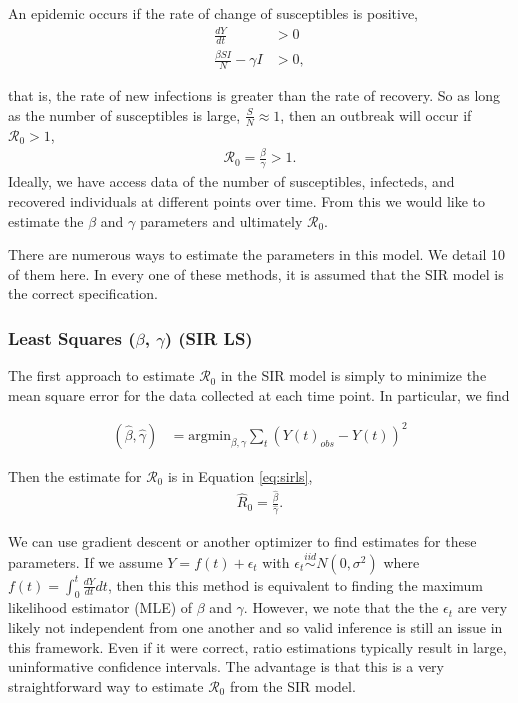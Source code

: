 \documentclass[12pt]{article}
\newcommand{\rr}{\ensuremath{\mathcal{R}_0}}
\begin{document}
An epidemic occurs if the rate of change of susceptibles is positive,
\begin{align*}
  \frac{dY}{dt} &> 0 \\
 \frac{\beta S I}{N}  - \gamma I &> 0 ,
\end{align*}

that is,  the rate of new infections is greater than the rate of recovery.  So as long as the number of susceptibles is large, $\frac{S}{N} \approx 1$, then an outbreak will occur if $\rr >1$,
\begin{align}\label{eq:deriv_sir}
  \rr = \frac{\beta}{\gamma} > 1.
  \end{align}
Ideally, we have access data of the number of susceptibles, infecteds, and recovered individuals at different points over time.  From this we would like to estimate the $\beta$ and $\gamma$ parameters and ultimately $\rr$.

There are numerous ways to estimate the parameters in this model.  We detail 10 of them here.  In every one of these methods, it is assumed that the SIR model is the correct specification.

\subsubsection{Least Squares ($\beta$, $\gamma$) (SIR LS)}\label{least-squares-beta-gamma}
The first approach to estimate $\rr$ in the SIR model is simply to minimize the mean square error for the data collected at each time point.  In particular, we find

\begin{align*}
(\hat{\beta}, \hat{\gamma} )&=\text{argmin}_{\beta, \gamma} \sum_{t} (Y(t)_{obs} - Y(t))^2 
\end{align*}

Then  the estimate for $\rr$ is in Equation \ref{eq:sirls},
\begin{align}\label{eq:sirls}
  \hat{R}_0= \frac{\hat{\beta}}{\hat{\gamma}}.
  \end{align}

We can use gradient descent or another optimizer to find estimates for these parameters.  If we assume $Y= f(t) + \epsilon_t$ with $\epsilon_t \overset{iid}{\sim} N(0, \sigma^2)$ where $f(t) = \int_0^t \frac{dY}{dt} dt$, then this this method is equivalent to finding the maximum likelihood estimator (MLE) of $\beta$ and $\gamma$.  However, we note that the the $\epsilon_t$ are very likely not independent from one another and so valid inference is still an issue in this framework.  Even if it were correct, ratio estimations typically result in large, uninformative confidence intervals.   The advantage is that this is a very straightforward way to estimate $\rr$ from the SIR model.
\end{document}
